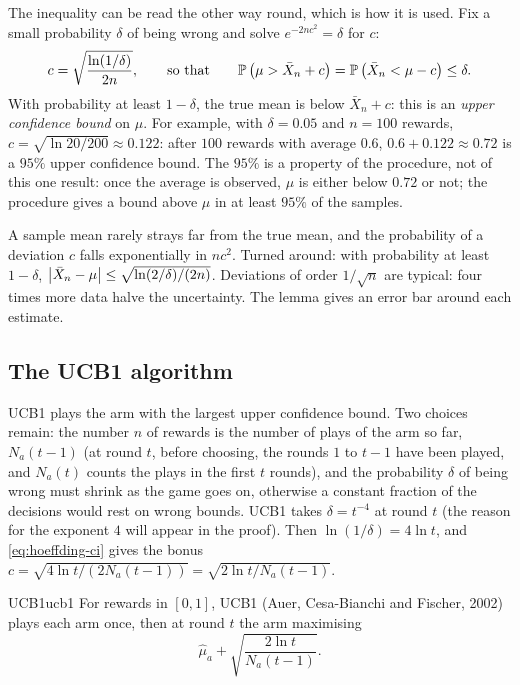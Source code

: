 The inequality can be read the other way round, which is how it is used. Fix
a small probability $\delta$ of being wrong and solve $e^{-2 n c^2} =
\delta$ for $c$:
\begin{equation}
  \label{eq:hoeffding-ci}
  c = \sqrt{\frac{\ln(1/\delta)}{2n}}, \qquad\text{so that}\qquad
  \mathbb{P}\left(\mu > \bar X_n + c\right) = \mathbb{P}\left(\bar X_n < \mu -
  c\right) \leq \delta.
\end{equation}
With probability at least $1 - \delta$, the true mean is below $\bar X_n +
c$: this is an \emph{upper confidence bound} on $\mu$. For example, with
$\delta = 0.05$ and $n = 100$ rewards, $c = \sqrt{\ln 20 / 200} \approx
0.122$: after $100$ rewards with average $0.6$, $0.6 + 0.122 \approx 0.72$ is
a $95\%$ upper confidence bound. The $95\%$ is a property of the
procedure, not of this one result: once the average is observed, $\mu$ is
either below $0.72$ or not; the procedure gives a bound above $\mu$ in at
least $95\%$ of the samples.

\begin{intuition}
  A sample mean rarely strays far from the true mean, and the probability
  of a deviation $c$ falls exponentially in $n c^2$. Turned around: with
  probability at least $1 - \delta$, $\left\lvert \bar X_n - \mu \right\rvert \leq
  \sqrt{\ln(2/\delta) / (2n)}$. Deviations of order $1/\sqrt{n}$ are
  typical: four times more data halve the uncertainty. The lemma gives an
  error bar around each estimate.
\end{intuition}

\subsection{The UCB1 algorithm}

UCB1 plays the arm with the largest upper confidence bound. Two choices
remain: the number $n$ of rewards is the number of plays of the arm so far,
$N_a(t-1)$ (at round $t$, before choosing, the rounds $1$ to $t - 1$ have
been played, and $N_a(t)$ counts the plays in the first $t$ rounds), and
the probability $\delta$ of being wrong must shrink as the
game goes on, otherwise a constant fraction of the decisions would rest on
wrong bounds. UCB1 takes $\delta = t^{-4}$ at round $t$ (the reason for
the exponent $4$ will appear in the proof). Then $\ln(1/\delta) = 4 \ln t$, and
\eqref{eq:hoeffding-ci} gives the bonus $c = \sqrt{4 \ln t / (2 N_a(t-1))}
= \sqrt{2 \ln t / N_a(t-1)}$.

\begin{definition}{UCB1}{ucb1}
  For rewards in $[0, 1]$, UCB1 (Auer, Cesa-Bianchi and Fischer, 2002)
  plays each arm once, then at round $t$ the arm maximising
  \begin{equation}
    \label{eq:ucb1}
    \hat\mu_a + \sqrt{\frac{2 \ln t}{N_a(t-1)}}.
  \end{equation}
\end{definition}

